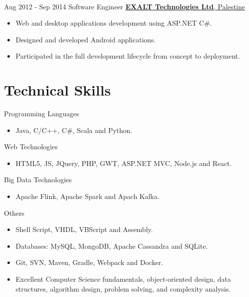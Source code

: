 \documentclass[letterpaper]{twentysecondcv} %
\begin{document}
\begin{twenty}
{{\begin{itemize}
        
    \end{itemize}}
        }
     \\
     \twentyitem
   		{Aug 2012 -}
		{Sep 2014}
        {Software Engineer}
        {\href{http://www.exalt-tech.com/about/}{\large\textbf{EXALT Technologies Ltd}, Palestine}}
        {}
        {
        \begin{itemize}
        \item Web and desktop applications development using ASP.NET C\#.
        \item Designed and developed Android applications. 
        \item Participated in the full development lifecycle from concept to deployment.
        
    \end{itemize}
    	}
        
\end{twenty}

\section{Technical  Skills}
\begin{twenty} %
	\twentyitem
	{}
	{}
	{Programming Languages}
	{}
	{}
	{ \begin{itemize}
			\item Java, C/C++, C\#, Scala and  Python.	\\	
	\end{itemize}}

	\twentyitem
{}
{}
{Web Technologies}
{}
{}
{ \begin{itemize}
		\item HTML5, JS, JQuery, PHP,  GWT, ASP.NET MVC, Node.js and React.	\\	
\end{itemize}}

		\twentyitem
	{}
	{}
	{Big Data Technologies}
	{}
	{}
	{ \begin{itemize}
			\item Apache Flink,  Apache
			Spark and Apach Kafka.	\\	
	\end{itemize}}

		\twentyitem
{}
{}
{Others}
{}
{}
{ \begin{itemize}
		\item Shell Script, VHDL, VBScript and Assembly.	
		\item Databases: MySQL, MongoDB, Apache Cassandra and SQLite.
		\item Git, SVN, Maven, Gradle, Webpack and Docker.
		\item Excellent Computer Science fundamentals, object-oriented design, data structures, algorithm design, problem solving, and complexity analysis.	
\end{itemize}}



\end{twenty}
\end{document}
